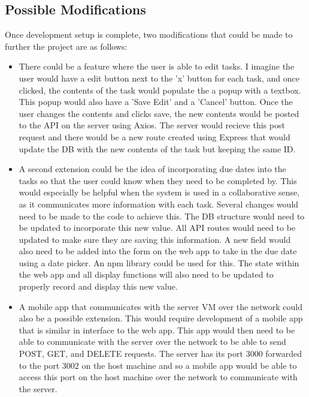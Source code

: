 \documentclass[12pt]{extarticle}
\begin{document}
\subsection{Possible Modifications}
Once development setup is complete, two modifications that could be made to further the project are as follows:
\begin{itemize}
\item There could be a feature where the user is able to edit tasks. I imagine the user would have a edit button next to the 'x' button for each task, and once clicked, the contents of the task would populate the a popup with a textbox. This popup would also have a 'Save Edit' and a 'Cancel' button. Once the user changes the contents and clicks save, the new contents would be posted to the API on the server using Axios. The server would recieve this post request and there would be a new route created using Express that would update the DB with the new contents of the task but keeping the same ID.

\item A second extension could be the idea of incorporating due dates into the tasks so that the user could know when they need to be completed by. This would especially be helpful when the system is used in a collaborative sense, as it communicates more information with each task. Several changes would need to be made to the code to achieve this. The DB structure would need to be updated to incorporate this new value. All API routes would need to be updated to make sure they are saving this information. A new field would also need to be added into the form on the web app to take in the due date using a date picker. An npm library could be used for this. The state within the web app and all display functions will also need to be updated to properly record and display this new value.

\item A mobile app that communicates with the server VM over the network could also be a possible extension. This would require development of a mobile app that is similar in interface to the web app. This app would then need to be able to communicate with the server over the network to be able to send POST, GET, and DELETE requests. The server has its port 3000 forwarded to the port 3002 on the host machine and so a mobile app would be able to access this port on the host machine over the network to communicate with the server. 

\end{itemize}
\end{document}
